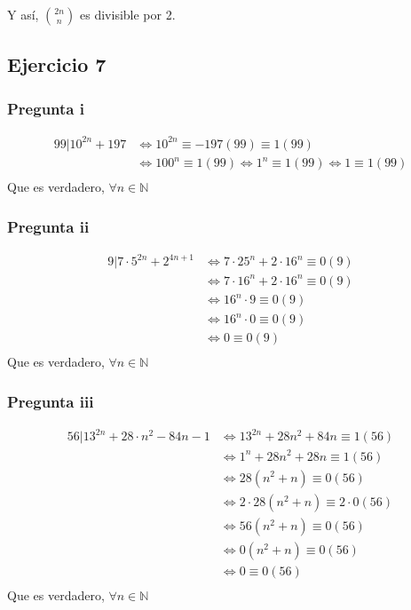 Y así, $\binom{2n}{n}$ es divisible por 2.

\subsection{Ejercicio 7}
\subsubsection{Pregunta i}
\begin{align*}
    99 | 10^{2n} + 197 &\iff 10^{2n} \equiv -197(99) \equiv 1(99) \\
    &\iff 100^{n} \equiv 1(99) \iff 1^n \equiv 1(99) \iff 1 \equiv 1(99) \\
\end{align*}
Que es verdadero, $ \forall n \in \mathbb{N} $

\subsubsection{Pregunta ii}
\begin{align*}
    9| 7\cdot 5^{2n} + 2^{4n+1} &\iff 7\cdot 25^n + 2\cdot 16^n \equiv 0(9) \\
    &\iff 7\cdot 16^n + 2\cdot 16^n \equiv 0(9) \\
    &\iff 16^n \cdot 9 \equiv 0(9) \\
    &\iff 16^n \cdot 0 \equiv 0(9) \\
    &\iff 0 \equiv 0(9) \\
\end{align*}
Que es verdadero, $ \forall n \in \mathbb{N} $

\subsubsection{Pregunta iii}
\begin{align*}
    56 | 13^{2n} + 28 \cdot n^2 - 84n -1 &\iff 13^{2n} + 28n^2 + 84n \equiv 1 (56) \\
    &\iff 1^{n} + 28n^2 + 28n \equiv 1 (56) \\
    &\iff 28(n^2+n)\equiv 0 (56) \\
    &\iff 2\cdot 28(n^2+n)\equiv 2\cdot 0 (56) \\
    &\iff 56(n^2+n)\equiv 0 (56) \\
    &\iff 0(n^2+n)\equiv 0 (56) \\
    &\iff 0\equiv 0 (56) \\
\end{align*}
Que es verdadero, $ \forall n \in \mathbb{N} $

